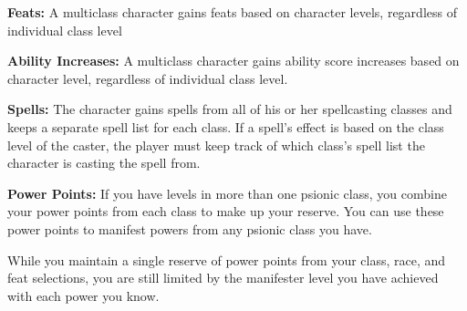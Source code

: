 \textbf{Feats:} A multiclass character gains feats based on character levels, regardless of individual class level

\textbf{Ability Increases:} A multiclass character gains ability score increases based on character level, regardless of individual class level.

\textbf{Spells:} The character gains spells from all of his or her spellcasting classes and keeps a separate spell list for each class. If a spell's effect is based on the class level of the caster, the player must keep track of which class's spell list the character is casting the spell from.

\textbf{Power Points:} If you have levels in more than one psionic class, you combine your power points from each class to make up your reserve. You can use these power points to manifest powers from any psionic class you have.

While you maintain a single reserve of power points from your class, race, and feat selections, you are still limited by the manifester level you have achieved with each power you know.